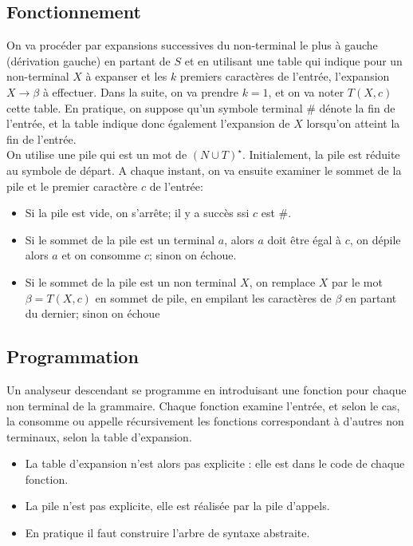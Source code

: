 \documentclass{cours}
\begin{document}
\subsection{Fonctionnement}
On va procéder par expansions successives du non-terminal le plus à gauche (dérivation gauche) en partant de $S$ et en utilisant une table qui indique pour un non-terminal $X$ à expanser et les $k$ premiers caractères de l'entrée, l'expansion $X\rightarrow\beta$ à effectuer. Dans la suite, on va prendre $k = 1$, et on va noter $T(X, c)$ cette table. En pratique, on suppose qu'un symbole terminal \# dénote la fin de l'entrée, et la table indique donc également l'expansion de $X$ lorsqu'on atteint la fin de l'entrée.\\
On utilise une pile qui est un mot de $\left(N \cup T\right)^{\star}$. Initialement, la pile est réduite au symbole de départ. A chaque instant, on va ensuite examiner le sommet de la pile et le premier caractère $c$ de l'entrée: 
\begin{itemize}
    \item Si la pile est vide, on s'arrête; il y a succès ssi $c$ est \#.
    \item Si le sommet de la pile est un terminal $a$, alors $a$ doit être égal à $c$, on dépile alors $a$ et on consomme $c$; sinon on échoue.
    \item Si le sommet de la pile est un non terminal $X$, on remplace $X$ par le mot $\beta = T(X, c)$ en sommet de pile, en empilant les caractères de $\beta$ en partant du dernier; sinon on échoue
\end{itemize}

\subsection{Programmation}
Un analyseur descendant se programme en introduisant une fonction pour chaque non terminal de la grammaire. Chaque fonction examine l'entrée, et selon le cas, la consomme ou appelle récursivement les fonctions correspondant à d'autres non terminaux, selon la table d'expansion. 
\begin{remark}
    \begin{itemize}
        \item La table d'expansion n'est alors pas explicite : elle est dans le code de chaque fonction.
        \item La pile n'est pas explicite, elle est réalisée par la pile d'appels.
        \item En pratique il faut construire l'arbre de syntaxe abstraite. 
    \end{itemize}
\end{remark}
\end{document}

